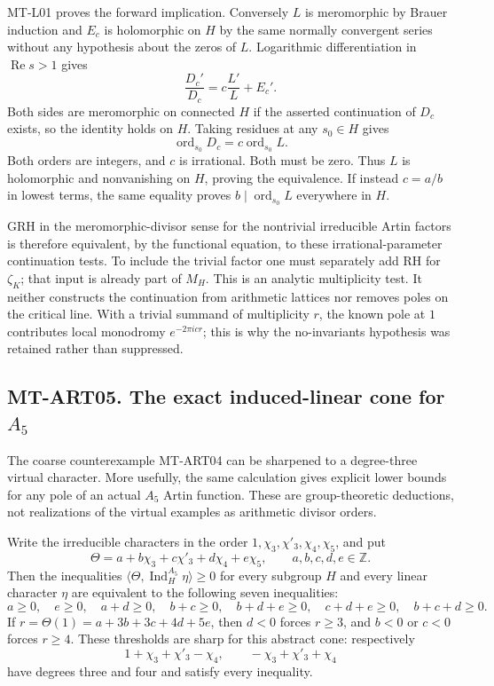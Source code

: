 MT-L01 proves the forward implication.  Conversely $L$ is meromorphic by
Brauer induction and $E_c$ is holomorphic on $H$ by the same normally
convergent series without any hypothesis about the zeros of $L$.
Logarithmic differentiation in $\operatorname{Re}s>1$ gives
\[
 \frac{D_c'}{D_c}=c\frac{L'}L+E_c'.
\]
Both sides are meromorphic on connected $H$ if the asserted continuation
of $D_c$ exists, so the identity holds on $H$.  Taking residues at any
$s_0\in H$ gives
\[
 \operatorname{ord}_{s_0}D_c
      =c\operatorname{ord}_{s_0}L.
\]
Both orders are integers, and $c$ is irrational.  Both must be zero.
Thus $L$ is holomorphic and nonvanishing on $H$, proving the equivalence.
If instead $c=a/b$ in lowest terms, the same equality proves
$b\mid\operatorname{ord}_{s_0}L$ everywhere in $H$.

GRH in the meromorphic-divisor sense for the nontrivial irreducible Artin
factors is therefore equivalent, by the functional equation, to these
irrational-parameter continuation tests.  To include the trivial factor one
must separately add RH for $\zeta_K$; that input is already part of $M_H$.
This is an analytic multiplicity test.  It neither constructs the
continuation from arithmetic lattices nor removes poles on the critical
line.  With a trivial summand of multiplicity $r$, the known pole at $1$
contributes local monodromy $e^{-2\pi i c r}$; this is why the no-invariants
hypothesis was retained rather than suppressed.

\subsection*{MT-ART05. The exact induced-linear cone for \texorpdfstring{$A_5$}{A5}}
The coarse counterexample MT-ART04 can be sharpened to a degree-three
virtual character. More usefully, the same calculation gives explicit
lower bounds for any pole of an actual $A_5$ Artin function. These are
group-theoretic deductions, not realizations of the virtual examples as
arithmetic divisor orders.

Write the irreducible characters in the order
$1,\chi_3,\chi'_3,\chi_4,\chi_5$, and put
\[
 \Theta=a+b\chi_3+c\chi'_3+d\chi_4+e\chi_5,
 \qquad a,b,c,d,e\in\mathbb Z.
\]
Then the inequalities
$\langle\Theta,\operatorname{Ind}_H^{A_5}\eta\rangle\ge0$ for
every subgroup $H$ and every linear character $\eta$ are equivalent to
the following seven inequalities:
\[
 a\ge0,\quad e\ge0,\quad a+d\ge0,\quad b+c\ge0,\quad
 b+d+e\ge0,\quad c+d+e\ge0,\quad b+c+d\ge0.       \tag{MT-A5-cone}
\]
If $r=\Theta(1)=a+3b+3c+4d+5e$, then $d<0$ forces $r\ge3$,
and $b<0$ or $c<0$ forces $r\ge4$. These thresholds are sharp for
this abstract cone: respectively
\[
       1+\chi_3+\chi'_3-\chi_4,
       \qquad -\chi_3+\chi'_3+\chi_4               \tag{MT-A5-ex}
\]
have degrees three and four and satisfy every inequality.

